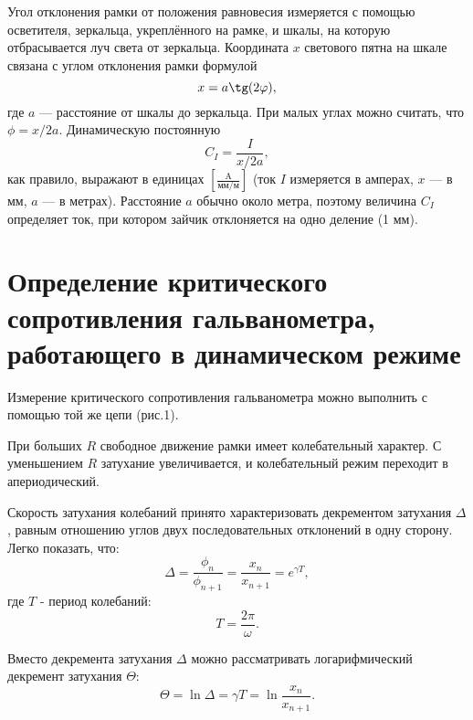 Угол отклонения рамки от положения равновесия измеряется с помощью осветителя, зеркальца, укреплённого на рамке, и шкалы, на которую отбрасывается луч света от зеркальца. Координата $x$ светового пятна на шкале связана с углом отклонения рамки формулой
$$ x = a \tg(2 \phi),$$
где $a$ — расстояние от шкалы до зеркальца. При малых углах можно считать, что $\phi = x/2a$. Динамическую постоянную
\begin{equation}
    C_I = \frac{I}{x / 2a},
\end{equation}
как правило, выражают в единицах $\left[\frac{\text{A}}{\text{мм/м}}\right]$ (ток $I$ измеряется в амперах, $x$ — в мм, $a$ — в метрах). Расстояние $a$ обычно около метра, поэтому величина $C_I$ определяет ток, при котором зайчик отклоняется на одно деление (1 мм).

\section{\label{sec:level1}Определение критического сопротивления гальванометра, работающего в динамическом режиме}

Измерение критического сопротивления гальванометра можно выполнить с помощью той же цепи (рис.1).

При больших $R$ свободное движение рамки имеет колебательный характер. С уменьшением $R$ затухание увеличивается, и колебательный режим переходит в апериодический.

Скорость затухания колебаний принято характеризовать декрементом затухания $\Delta$, равным отношению углов двух последовательных отклонений в одну сторону. Легко показать, что:
$$ \Delta = \frac{\phi_n}{\phi_{n+1}} = \frac{x_n}{x_{n+1}} = e^{\gamma T},$$
где $T$ - период колебаний:
\begin{equation}
    T = \frac{2 \pi}{\omega}.
\end{equation}

Вместо декремента затухания $\Delta$ можно рассматривать логарифмический декремент затухания $\Theta$:
\begin{equation}
    \Theta = \ln \Delta = \gamma T = \ln \frac{x_n}{x_{n+1}}.
\end{equation}

